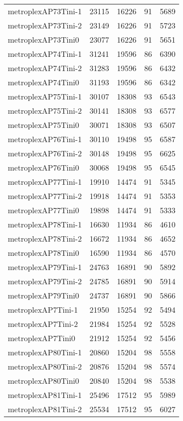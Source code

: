 \begin{tabular}{lrrrr}
metroplexAP73Tini-1 & 23115 & 16226 & 91 & 5689 \\
metroplexAP73Tini-2 & 23149 & 16226 & 91 & 5723 \\
metroplexAP73Tini0 & 23077 & 16226 & 91 & 5651 \\
metroplexAP74Tini-1 & 31241 & 19596 & 86 & 6390 \\
metroplexAP74Tini-2 & 31283 & 19596 & 86 & 6432 \\
metroplexAP74Tini0 & 31193 & 19596 & 86 & 6342 \\
metroplexAP75Tini-1 & 30107 & 18308 & 93 & 6543 \\
metroplexAP75Tini-2 & 30141 & 18308 & 93 & 6577 \\
metroplexAP75Tini0 & 30071 & 18308 & 93 & 6507 \\
metroplexAP76Tini-1 & 30110 & 19498 & 95 & 6587 \\
metroplexAP76Tini-2 & 30148 & 19498 & 95 & 6625 \\
metroplexAP76Tini0 & 30068 & 19498 & 95 & 6545 \\
metroplexAP77Tini-1 & 19910 & 14474 & 91 & 5345 \\
metroplexAP77Tini-2 & 19918 & 14474 & 91 & 5353 \\
metroplexAP77Tini0 & 19898 & 14474 & 91 & 5333 \\
metroplexAP78Tini-1 & 16630 & 11934 & 86 & 4610 \\
metroplexAP78Tini-2 & 16672 & 11934 & 86 & 4652 \\
metroplexAP78Tini0 & 16590 & 11934 & 86 & 4570 \\
metroplexAP79Tini-1 & 24763 & 16891 & 90 & 5892 \\
metroplexAP79Tini-2 & 24785 & 16891 & 90 & 5914 \\
metroplexAP79Tini0 & 24737 & 16891 & 90 & 5866 \\
metroplexAP7Tini-1 & 21950 & 15254 & 92 & 5494 \\
metroplexAP7Tini-2 & 21984 & 15254 & 92 & 5528 \\
metroplexAP7Tini0 & 21912 & 15254 & 92 & 5456 \\
metroplexAP80Tini-1 & 20860 & 15204 & 98 & 5558 \\
metroplexAP80Tini-2 & 20876 & 15204 & 98 & 5574 \\
metroplexAP80Tini0 & 20840 & 15204 & 98 & 5538 \\
metroplexAP81Tini-1 & 25496 & 17512 & 95 & 5989 \\
metroplexAP81Tini-2 & 25534 & 17512 & 95 & 6027 \\

\end{tabular}
